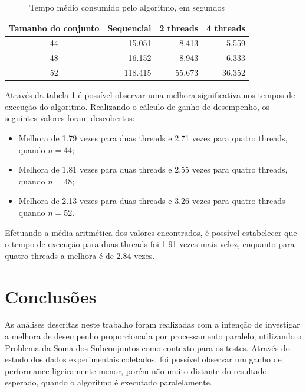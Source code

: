 \documentclass[12pt]{article}
\begin{document}
\begin{table}[ht]
    \centering
    \caption{Tempo médio consumido pelo algoritmo, em segundos}
    \label{tab:speedtable}
    \smallskip

    \begingroup
    \renewcommand*{\arraystretch}{1.2}

    \begin{tabular}{|c|r|r|r|}
        \hline
        \textbf{Tamanho do conjunto} & \textbf{Sequencial} & \textbf{2 threads} & \textbf{4 threads} \\
        \hline
        44 & 15.051 & 8.413 & 5.559 \\
        \hline
        48 & 16.152 & 8.943 & 6.333 \\
        \hline
        52 & 118.415 & 55.673 & 36.352 \\
        \hline
    \end{tabular}

    \endgroup

\end{table}

Através da tabela \ref{tab:speedtable} é possível observar uma melhora significativa nos tempos de execução do algoritmo. Realizando o cálculo de ganho de desempenho, os seguintes valores foram descobertos:

\begin{itemize}
    \item Melhora de 1.79 vezes para duas threads e 2.71 vezes para quatro threads, quando $n = 44$;
    \item Melhora de 1.81 vezes para duas threads e 2.55 vezes para quatro threads, quando $n = 48$;
    \item Melhora de 2.13 vezes para duas threads e 3.26 vezes para quatro threads quando $n = 52$.
\end{itemize}

Efetuando a média aritmética dos valores encontrados, é possível estabelecer que o tempo de execução para duas threads foi 1.91 vezes mais veloz, enquanto para quatro threads a melhora é de 2.84 vezes.

\section{Conclusões} \label{sec:conclusions}

As análises descritas neste trabalho foram realizadas com a intenção de investigar a melhora de desempenho proporcionada por processamento paralelo, utilizando o Problema da Soma dos Subconjuntos como contexto para os testes. Através do estudo dos dados experimentais coletados, foi possível observar um ganho de performance ligeiramente menor, porém não muito distante do resultado esperado, quando o algoritmo é executado paralelamente.
\end{document}

